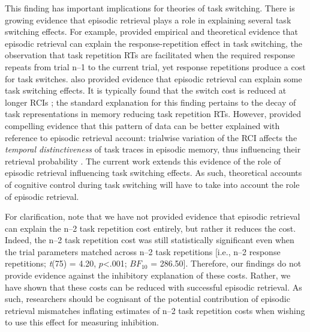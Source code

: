 \documentclass[a4paper, doc, natbib]{apa6}
\begin{document}
This finding has important implications for theories of task switching. There is growing evidence that episodic retrieval plays a role in explaining several task switching effects. For example, \cite{Altmann2011} provided empirical and theoretical evidence that episodic retrieval can explain the response-repetition effect in task switching, the observation that task repetition RTs are facilitated when the required response repeats from trial n--1 to the current trial, yet response repetitions produce a cost for task switches. \cite{Horoufchin2011a} \citep[see also][]{Horoufchin2011} also provided evidence that episodic retrieval can explain some task switching effects. It is typically found that the switch cost is reduced at longer RCIs \cite[e.g.,][]{Meiran2000a}; the standard explanation for this finding pertains to the decay of task representations in memory reducing task repetition RTs. However, \cite{Horoufchin2011a} provided compelling evidence that this pattern of data can be better explained with reference to episodic retrieval account: trialwise variation of the RCI affects the \emph{temporal distinctiveness} of task traces in episodic memory, thus influencing their retrieval probability \citep{Brown2007,Grange2015}. The current work extends this evidence of the role of episodic retrieval influencing task switching effects. As such, theoretical accounts of cognitive control during task switching will have to take into account the role of episodic retrieval. 

For clarification, note that we have not provided evidence that episodic retrieval can explain the n--2 task repetition cost entirely, but rather it reduces the cost. Indeed, the n--2 task repetition cost was still statistically significant even when the trial parameters matched across n--2 task repetitions [i.e., n--2 response repetitions; \emph{t}(75) = 4.20, $p$<.001; $BF_{10}$ = 286.50]. Therefore, our findings do not provide evidence against the inhibitory explanation of these costs. Rather, we have shown that these costs can be reduced with successful episodic retrieval. As such, researchers should be cognisant of the potential contribution of episodic retrieval mismatches inflating estimates of n--2 task repetition costs when wishing to use this effect for measuring inhibition.
\end{document}
